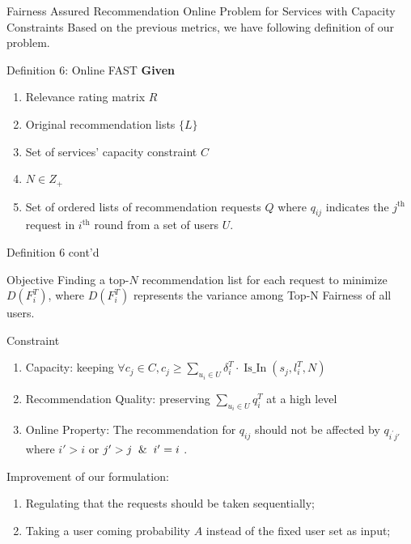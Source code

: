 
\begin{frame}{Fairness Assured Recommendation Online Problem for Services with Capacity Constraints}
    Based on the previous metrics, we have following definition of our problem.
\begin{block}{Definition 6: Online FAST}
\textbf{Given}

\begin{enumerate}
    \item Relevance rating matrix $R$
    \item Original recommendation lists $\{L\}$
    \item Set of services' capacity constraint $C$
    \item $N\in Z_{+}$
    \item Set of ordered lists of recommendation requests $Q$ where $q_{ij}$ indicates the $j^{\text{th}}$ request in $i^{\text{th}}$ round from a set of users $U$.
    
\end{enumerate}

\end{block}
\end{frame}

\begin{frame}{Definition 6 cont'd}
\begin{block}{Objective}
Finding a top-$N$ recommendation list for each request to minimize $D(F_i^T)$, where $D\left(F_{i}^{T}\right)$ represents the variance among Top-N Fairness of all users.
\end{block}
\begin{block}{Constraint}

\begin{enumerate}\setlength{\itemsep}{-0.1cm}
    \item Capacity: keeping $\forall c_{j} \in C, c_{j} \geqslant \sum_{u_{i} \in U} \delta_{i}^{T} \cdot  \operatorname{Is\_In}\left(s_{j}, l_{i}^{T}, N\right)$
    \item Recommendation Quality: preserving $\sum_{u_{i} \in U} q_{i}^{T}$ at a high level
    \item Online Property: The recommendation for $q_{ij}$ should not be affected by $q_{i^{\prime}j'}$ where $ i' > i$ or  $j'> j \And i' = i$ .
\end{enumerate}
\end{block}

{Improvement of our formulation:}
    \begin{enumerate}
        \item Regulating that the requests should be taken sequentially;
        \item Taking a user coming probability $A$ instead of the fixed user set as input;
    \end{enumerate}
    
\end{frame}





